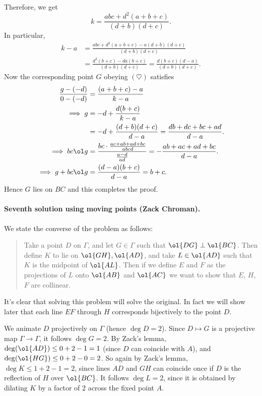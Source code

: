 \documentclass[11pt]{scrartcl}
\begin{document}
Therefore, we get
\[ k = \frac{abc+d^2(a+b+c)}{(d+b)(d+c)}. \]
In particular,
\begin{align*}
  k-a &= \frac{abc+d^2(a+b+c)-a(d+b)(d+c)}{(d+b)(d+c)} \\
  &= \frac{d^2(b+c)-da(b+c)}{(d+b)(d+c)}
  = \frac{d(b+c)(d-a)}{(d+b)(d+c)}.
\end{align*}
Now the corresponding point $G$ obeying $(\heartsuit)$ satisfies
\begin{align*}
  \frac{g-(-d)}{0-(-d)} &= \frac{(a+b+c)-a}{k-a} \\
  \implies g &= -d + \frac{d(b+c)}{k-a} \\
  &= -d + \frac{(d+b)(d+c)}{d-a} = \frac{db+dc+bc+ad}{d-a}. \\
  \implies bc \ol g &= \frac{bc \cdot \frac{ac+ab+ad+bc}{abcd}}{\frac{a-d}{ad}}
  = -\frac{ab+ac+ad+bc}{d-a}. \\
  \implies g + bc \ol g &= \frac{(d-a)(b+c)}{d-a} = b+c.
\end{align*}
Hence $G$ lies on $BC$ and this completes the proof.


\paragraph{Seventh solution using moving points (Zack Chroman).}
We state the converse of the problem as follows:

\begin{quote}
Take a point $D$ on $\Gamma$,
and let $G\in \Gamma$ such that $\ol{DG} \perp \ol{BC}$.
Then define $K$ to lie on $\ol{GH}, \ol{AD}$,
and take $L \in \ol{AD}$ such that $K$ is the midpoint of $\ol{AL}$.
Then if we define $E$ and $F$ as the projections of $L$ onto $\ol{AB}$ and $\ol{AC}$
we want to show that $E$, $H$, $F$ are collinear.
\end{quote}

It's clear that solving this problem will solve the original.
In fact we will show later that each line $EF$ through $H$
corresponds bijectively to the point $D$.

We animate $D$ projectively on $\Gamma$
(hence $\deg D = 2$).
Since $D \mapsto G$ is a projective map $\Gamma \to \Gamma$,
it follows $\deg G = 2$.
By Zack's lemma, $\deg(\ol{AD}) \le 0 + 2 - 1 = 1$
(since $D$ can coincide with $A$),
and $\deg(\ol{HG}) \le 0 + 2 - 0 = 2$.
So again by Zack's lemma, $\deg K \le 1 + 2 - 1 = 2$,
since lines $AD$ and $GH$ can coincide once if $D$ is the reflection
of $H$ over $\ol{BC}$.
It follows $\deg L = 2$,
since it is obtained by dilating $K$ by a factor of $2$
across the fixed point $A$.
\end{document}
